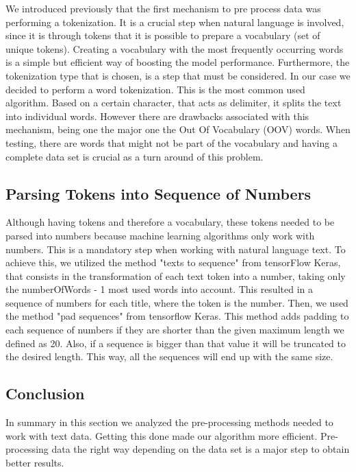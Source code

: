 \documentclass[conference]{IEEEtran}
\newcommand\tab[1][0.4cm]{\hspace*{#1}}
\begin{document}
We introduced previously that the first mechanism to pre process data was performing a tokenization. It is a crucial step when natural language is involved, since it is through tokens that it is possible to prepare a vocabulary (set of unique tokens).
\linebreak
\tab Creating a vocabulary with the most frequently occurring words is a simple but efficient way of boosting the model performance.
Furthermore, the tokenization type that is chosen, is a step that must be considered. In our case we decided to perform a word tokenization. This is the most common used algorithm. Based on a certain character, that acts as delimiter, it splits the text into individual words. However there are drawbacks associated with this mechanism, being one the major one the Out Of Vocabulary (OOV) words. When testing, there are words that might not be part of the vocabulary and having a complete data set is crucial as a turn around of this problem.

\subsection{Parsing Tokens into Sequence of Numbers \cite{X}}

Although having tokens and therefore a vocabulary, these tokens needed to be parsed into numbers because machine learning algorithms only work with numbers. This is a mandatory step when working with natural language text. To achieve this, we utilized the method "texts to sequence" \cite{Y} from tensorFlow Keras, that consists in the transformation of each text token into a number, taking only the numberOfWords - 1 most used words into account. This resulted in a sequence of numbers for each title, where the token is the number.
Then, we used the method "pad sequences" \cite{Z} from tensorflow Keras. This method adds padding to each sequence of numbers if they are shorter than the given maximum length we defined as 20. Also, if a sequence is bigger than that value it will be truncated to the desired length. This way, all the sequences will end up with the same size.

\subsection{Conclusion}
In summary in this section we analyzed the pre-processing methods needed to work with text data. Getting this done made our algorithm more efficient. Pre-processing data the right way depending on the data set is a major step to obtain better results.
\end{document}
